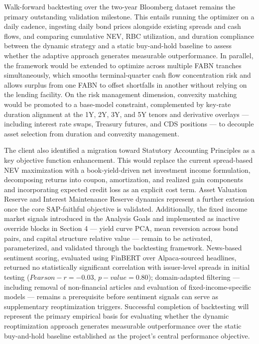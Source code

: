 \documentclass[12pt]{article}
\begin{document}
Walk-forward backtesting over the two-year Bloomberg dataset remains the primary outstanding validation milestone. This entails running the optimizer on a daily cadence, ingesting daily bond prices alongside existing spreads and cash flows, and comparing cumulative NEV, RBC utilization, and duration compliance between the dynamic strategy and a static buy-and-hold baseline to assess whether the adaptive approach generates measurable outperformance. In parallel, the framework would be extended to optimize across multiple FABN tranches simultaneously, which smooths terminal-quarter cash flow concentration risk and allows surplus from one FABN to offset shortfalls in another without relying on the lending facility. On the risk management dimension, convexity matching would be promoted to a base-model constraint, complemented by key-rate duration alignment at the 1Y, 2Y, 3Y, and 5Y tenors and derivative overlays — including interest rate swaps, Treasury futures, and CDS positions — to decouple asset selection from duration and convexity management.

The client also identified a migration toward Statutory Accounting Principles as a key objective function enhancement. This would replace the current spread-based NEV maximization with a book-yield-driven net investment income formulation, decomposing returns into coupon, amortization, and realized gain components and incorporating expected credit loss as an explicit cost term. Asset Valuation Reserve and Interest Maintenance Reserve dynamics represent a further extension once the core SAP-faithful objective is validated. Additionally, the fixed income market signals introduced in the Analysis Goals and implemented as inactive override blocks in Section 4 — yield curve PCA, mean reversion across bond pairs, and capital structure relative value — remain to be activated, parameterized, and validated through the backtesting framework. News-based sentiment scoring, evaluated using FinBERT over Alpaca-sourced headlines, returned no statistically significant correlation with issuer-level spreads in initial testing ($Pearson-r = -0.03$, $p-value = 0.80$); domain-adapted filtering — including removal of non-financial articles and evaluation of fixed-income-specific models — remains a prerequisite before sentiment signals can serve as supplementary reoptimization triggers. Successful completion of backtesting will represent the primary empirical basis for evaluating whether the dynamic reoptimization approach generates measurable outperformance over the static buy-and-hold baseline established as the project's central performance objective.
\end{document}
